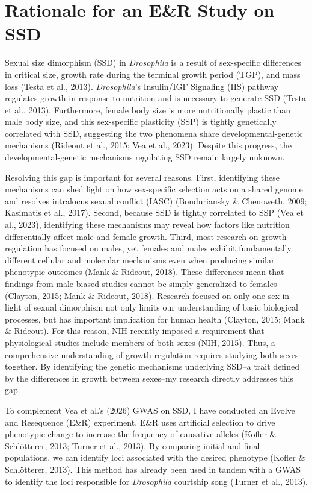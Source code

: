 \documentclass[12pt,reqno,oneside]{report}
\begin{document}
\section{Rationale for an E\&R Study on SSD}

Sexual size dimorphism (SSD) in \textit{Drosophila} is a result of sex-specific differences in critical size, growth rate during the terminal growth period (TGP), and mass loss (Testa et al., 2013). \textit{Drosophila}'s Insulin/IGF Signaling (IIS) pathway regulates growth in response to nutrition and is necessary to generate SSD (Testa et al., 2013). Furthermore, female body size is more nutritionally plastic than male body size, and this sex-specific plasticity (SSP) is tightly genetically correlated with SSD, suggesting the two phenomena share developmental-genetic mechanisms (Rideout et al., 2015; Vea et al., 2023). Despite this progress, the developmental-genetic mechanisms regulating SSD remain largely unknown. 

Resolving this gap is important for several reasons. First, identifying these mechanisms can shed light on how sex-specific selection acts on a shared genome and resolves intralocus sexual conflict (IASC) (Bonduriansky \& Chenoweth, 2009; Kasimatis et al., 2017). Second, because SSD is tightly correlated to SSP (Vea et al., 2023), identifying these mechanisms may reveal how factors like nutrition differentially affect male and female growth. Third, most research on growth regulation has focused on males, yet females and males exhibit fundamentally different cellular and molecular mechanisms even when producing similar phenotypic outcomes (Mank \& Rideout, 2018). These differences mean that findings from male-biased studies cannot be simply generalized to females (Clayton, 2015; Mank \& Rideout, 2018). Research focused on only one sex in light of sexual dimorphism not only limits our understanding of basic biological processes, but has important implication for human health (Clayton, 2015; Mank \& Rideout). For this reason, NIH recently imposed a requirement that physiological studies include members of both sexes (NIH, 2015). Thus, a comprehensive understanding of growth regulation requires studying both sexes together. By identifying the genetic mechanisms underlying SSD--a trait defined by the differences in growth between sexes--my research directly addresses this gap.

To complement Vea et al.'s (2026) GWAS on SSD, I have conducted an Evolve and Resequence (E\&R) experiment. E\&R uses artificial selection to drive phenotypic change to increase the frequency of causative alleles (Kofler \& Schlötterer, 2013; Turner et al., 2013). By comparing initial and final populations, we can identify loci associated with the desired phenotype (Kofler \& Schlötterer, 2013). This method has already been used in tandem with a GWAS to identify the loci responsible for \textit{Drosophila} courtship song (Turner et al., 2013).
\end{document}
